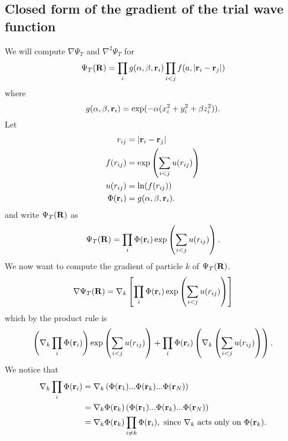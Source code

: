 \documentclass[a4paper,10pt]{article}
\begin{document}
\begin{appendices}
\subsection{Closed form of the gradient of the trial wave function} \label{closed gradient}
We will compute $\nabla \Psi_T$ and $\nabla^2 \Psi_T$ for 
\begin{equation}
 \Psi_T({\bf R}) = \prod_i g(\alpha,\beta,{\bf r}_i)\prod_{i<j}f(a,|{\bf r}_i - {\bf r}_j|)
\end{equation}
where
\begin{equation}
 g(\alpha,\beta,{\bf r}_i) = \exp (-\alpha(x_i^2 + y_i^2 + \beta z_i^2)).
\end{equation}
Let
\begin{align}
 r_{ij} &= |{\bf r}_i - {\bf r}_j|                     \\
 f(r_{ij}) &= \exp\left( \sum _{i<j}u(r_{ij})\right)    \\
 u(r_{ij}) &= \ln (f(r_{ij}))                          \\
 \Phi({\bf r}_i) &= g(\alpha,\beta,{\bf r}_i).
\end{align}
and write $\Psi_T({\bf R})$ as
\begin{equation}
 \Psi_T({\bf R}) = \prod_i\Phi({\bf r}_i )\exp \left( \sum _{i<j}u(r_{ij})\right).
\end{equation}
We now want to compute the gradient of particle $k$ of $\Psi_T({\bf R})$.
\begin{equation}
 \nabla \Psi_T({\bf R}) = \nabla_k\left[\prod_i\Phi({\bf r}_i) \exp \left( \sum _{i<j}u(r_{ij})\right)\right]
\end{equation}
which by the product rule is
\begin{equation}
 \left(\nabla_k\prod_i\Phi({\bf r}_i)\right)\exp \left( \sum _{i<j}u(r_{ij})\right) + \prod_i\Phi({\bf r}_i)\left(\nabla_k\left( \sum _{i<j}u(r_{ij})\right)\right).
\end{equation}
We notice that
\begin{align*}
 \nabla_k\prod_i\Phi({\bf r}_i) &= \nabla_k \left( \Phi({\bf r}_1)...\Phi({\bf r}_k)...\Phi({\bf r}_N) \right)                 \\
                                &= \nabla_k \Phi({\bf r}_k) \left( \Phi({\bf r}_1)...{\Phi({\bf r}_k)}...\Phi({\bf r}_N) \right) \\
                                &= \nabla_k \Phi({\bf r}_k) \prod_{i\neq k}\Phi({\bf r}_i),\ \text{since} \  \nabla_k \  \text{acts only on} \ \Phi({\bf r}_k).                                
\end{align*}

\end{appendices}
\end{document}
